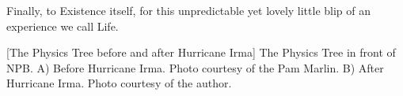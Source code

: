 Finally, to Existence itself, for this unpredictable yet lovely little blip of an experience we call Life.
\begin{multiFigure}
    \centering
        [The Physics Tree before and after Hurricane Irma]
        {The Physics Tree in front of NPB.
        \;A) Before Hurricane Irma. Photo courtesy of the Pam Marlin.
        \;B) After Hurricane Irma. Photo courtesy of the author.
        }
    \label{fig:phys_tree}
\end{multiFigure}

